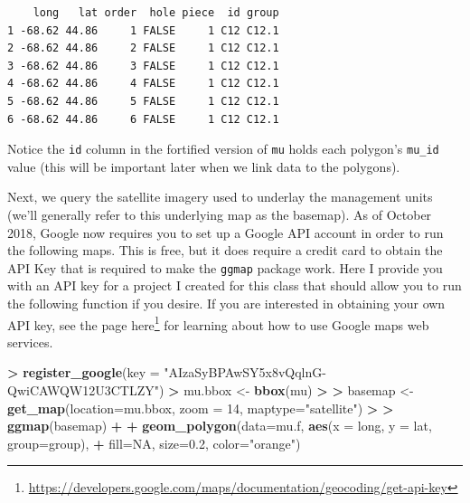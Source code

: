 \documentclass[]{krantz}
\makeatletter
\newenvironment{Shaded}{\begin{snugshade}}{\end{snugshade}}
\newcommand{\DataTypeTok}[1]{\textcolor[rgb]{0.27,0.27,0.27}{#1}}
\newcommand{\DecValTok}[1]{\textcolor[rgb]{0.06,0.06,0.06}{#1}}
\newcommand{\ErrorTok}[1]{\textcolor[rgb]{0.14,0.14,0.14}{\textbf{#1}}}
\newcommand{\FloatTok}[1]{\textcolor[rgb]{0.06,0.06,0.06}{#1}}
\newcommand{\KeywordTok}[1]{\textcolor[rgb]{0.27,0.27,0.27}{\textbf{#1}}}
\newcommand{\NormalTok}[1]{#1}
\newcommand{\OperatorTok}[1]{\textcolor[rgb]{0.43,0.43,0.43}{\textbf{#1}}}
\newcommand{\OtherTok}[1]{\textcolor[rgb]{0.37,0.37,0.37}{#1}}
\newcommand{\StringTok}[1]{\textcolor[rgb]{0.5,0.5,0.5}{#1}}
\renewcommand{\href}[2]{#2\footnote{\url{#1}}}
\newenvironment{kframe}{%
\medskip{}
\setlength{\fboxsep}{.8em}
 \def\at@end@of@kframe{}%
 \ifinner\ifhmode%
  \def\at@end@of@kframe{\end{minipage}}%
  \begin{minipage}{\columnwidth}%
 \fi\fi%
 \def\FrameCommand##1{\hskip\@totalleftmargin \hskip-\fboxsep
 \colorbox{shadecolor}{##1}\hskip-\fboxsep
     \hskip-\linewidth \hskip-\@totalleftmargin \hskip\columnwidth}%
 \MakeFramed {\advance\hsize-\width
   \@totalleftmargin\z@ \linewidth\hsize
   \@setminipage}}%
 {\par\unskip\endMakeFramed%
 \at@end@of@kframe}
\renewenvironment{Shaded}{\begin{kframe}}{\end{kframe}}
\makeatother
\begin{document}
\begin{verbatim}
    long   lat order  hole piece  id group
1 -68.62 44.86     1 FALSE     1 C12 C12.1
2 -68.62 44.86     2 FALSE     1 C12 C12.1
3 -68.62 44.86     3 FALSE     1 C12 C12.1
4 -68.62 44.86     4 FALSE     1 C12 C12.1
5 -68.62 44.86     5 FALSE     1 C12 C12.1
6 -68.62 44.86     6 FALSE     1 C12 C12.1
\end{verbatim}

Notice the \texttt{id} column in the fortified version of \texttt{mu} holds each polygon's \texttt{mu\_id} value (this will be important later when we link data to the polygons).

Next, we query the satellite imagery used to underlay the management units (we'll generally refer to this underlying map as the basemap). As of October 2018, Google now requires you to set up a Google API account in order to run the following maps. This is free, but it does require a credit card to obtain the API Key that is required to make the \texttt{ggmap} package work. Here I provide you with an API key for a project I created for this class that should allow you to run the following function if you desire. If you are interested in obtaining your own API key, see the page \href{https://developers.google.com/maps/documentation/geocoding/get-api-key}{here} for learning about how to use Google maps web services.

\begin{Shaded}
\begin{Highlighting}[]
\OperatorTok{>}\StringTok{ }\KeywordTok{register_google}\NormalTok{(}\DataTypeTok{key =} \StringTok{"AIzaSyBPAwSY5x8vQqlnG-QwiCAWQW12U3CTLZY"}\NormalTok{)}
\OperatorTok{>}\StringTok{ }\NormalTok{mu.bbox <-}\StringTok{ }\KeywordTok{bbox}\NormalTok{(mu)}
\OperatorTok{>}\StringTok{ }
\ErrorTok{>}\StringTok{ }\NormalTok{basemap <-}\StringTok{ }\KeywordTok{get_map}\NormalTok{(}\DataTypeTok{location=}\NormalTok{mu.bbox, }\DataTypeTok{zoom =} \DecValTok{14}\NormalTok{, }\DataTypeTok{maptype=}\StringTok{"satellite"}\NormalTok{)}
\OperatorTok{>}\StringTok{ }
\ErrorTok{>}\StringTok{ }\KeywordTok{ggmap}\NormalTok{(basemap) }\OperatorTok{+}
\OperatorTok{+}\StringTok{     }\KeywordTok{geom_polygon}\NormalTok{(}\DataTypeTok{data=}\NormalTok{mu.f, }\KeywordTok{aes}\NormalTok{(}\DataTypeTok{x =}\NormalTok{ long, }\DataTypeTok{y =}\NormalTok{ lat, }\DataTypeTok{group=}\NormalTok{group), }
\OperatorTok{+}\StringTok{                  }\DataTypeTok{fill=}\OtherTok{NA}\NormalTok{, }\DataTypeTok{size=}\FloatTok{0.2}\NormalTok{, }\DataTypeTok{color=}\StringTok{"orange"}\NormalTok{)}
\end{Highlighting}
\end{Shaded}
\end{document}
